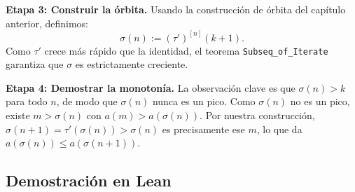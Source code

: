 \medskip
\textbf{Etapa 3: Construir la órbita.}
Usando la construcción de órbita del capítulo anterior, definimos:
\[
  \sigma(n) := (\tau')^{[n]}(k+1).
\]
Como $\tau'$ crece más rápido que la identidad, el teorema
\texttt{Subseq\_of\_Iterate} garantiza que $\sigma$ es estrictamente creciente.

\medskip
\textbf{Etapa 4: Demostrar la monotonía.}
La observación clave es que $\sigma(n) > k$ para todo $n$, de modo que
$\sigma(n)$ nunca es un pico. Como $\sigma(n)$ no es un pico, existe
$m > \sigma(n)$ con $a(m) > a(\sigma(n))$. Por nuestra construcción,
$\sigma(n+1) = \tau'(\sigma(n)) > \sigma(n)$ es precisamente ese $m$, lo que
da $a(\sigma(n)) \leq a(\sigma(n+1))$.

\subsection{Demostración en Lean}

